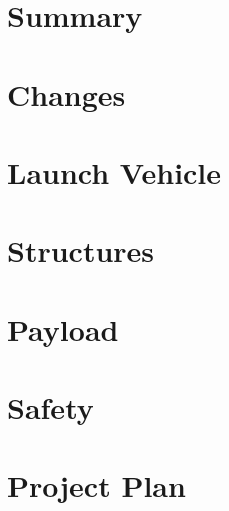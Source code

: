 \listoftodos

\listoffigures
	
\listoftables

\clearpage



\printglossary[type=\acronymtype]

\newpage

\tableofcontents



\part{Summary}



\part{Changes}

\part{Launch Vehicle}





\part{Structures}









\part{Payload}











%

\part{Safety}



\part{Project Plan}






